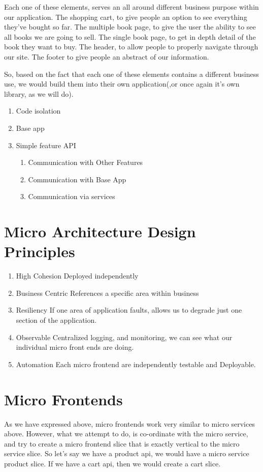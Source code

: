 Each one of these elements, serves an all around different business purpose within our application. The shopping cart, to give people an option to see everything they've bought so far. The multiple book page, to give the user the ability to see all books we are going to sell. The single book page, to get in depth detail of the book they want to buy. The header, to allow people to properly navigate through our site. The footer to give people an abstract of our information. 

So, based on the fact that each one of these elements contains a different business use, we would build them into their own application(,or once again it's own library, as we will do).

\begin{enumerate}
  \item Code isolation
  \item Base app
  \item Simple feature API
  \begin{enumerate}
    \item Communication with Other Features
    \item Communication with Base App
    \item Communication via services
  \end{enumerate}
\end{enumerate}


\section{Micro Architecture Design Principles}
\begin{enumerate}
  \item High Cohesion 
Deployed independently 
  \item Business Centric
References a specific area within business 
  \item Resiliency 
If one area of application faults, allows us to degrade just one section of the application. 
  \item Observable 
Centralized logging, and monitoring, we can see what our individual micro front ends are doing.
  \item Automation 
Each micro frontend are independently testable and Deployable. 
\end{enumerate}

\section{Micro Frontends}
As we have expressed above, micro frontends work very similar to micro services above. However, what we attempt to do, is co-ordinate with the micro service, and try to create a micro frontend slice that is exactly vertical to the micro service slice. So let's say we have a product api, we would have a micro service product slice. If we have a cart api, then we would create a cart slice. 

